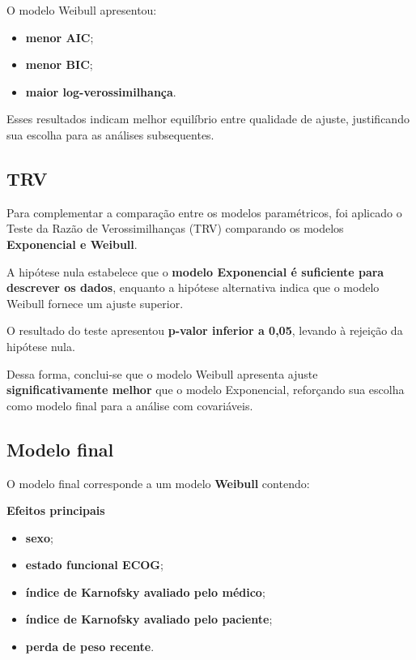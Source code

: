 \documentclass[
  brazilian,
  letterpaper,
  DIV=11,
  numbers=noendperiod]{scrartcl}
\providecommand{\tightlist}{%
  \setlength{\itemsep}{0pt}\setlength{\parskip}{0pt}}
\begin{document}
O modelo Weibull apresentou:

\begin{itemize}
\tightlist
\item
  \textbf{menor AIC};
\item
  \textbf{menor BIC};
\item
  \textbf{maior log-verossimilhança}.
\end{itemize}

Esses resultados indicam melhor equilíbrio entre qualidade de ajuste,
justificando sua escolha para as análises subsequentes.

\subsection{\texorpdfstring{\textbf{TRV}}{TRV}}\label{trv}

Para complementar a comparação entre os modelos paramétricos, foi
aplicado o Teste da Razão de Verossimilhanças (TRV) comparando os
modelos \textbf{Exponencial e Weibull}.

A hipótese nula estabelece que o \textbf{modelo Exponencial é suficiente
para descrever os dados}, enquanto a hipótese alternativa indica que o
modelo Weibull fornece um ajuste superior.

O resultado do teste apresentou \textbf{p-valor inferior a 0,05},
levando à rejeição da hipótese nula.

Dessa forma, conclui-se que o modelo Weibull apresenta ajuste
\textbf{significativamente melhor} que o modelo Exponencial, reforçando
sua escolha como modelo final para a análise com covariáveis.

\subsection{\texorpdfstring{\textbf{Modelo
final}}{Modelo final}}\label{modelo-final}

O modelo final corresponde a um modelo \textbf{Weibull} contendo:

\textbf{Efeitos principais}

\begin{itemize}
\tightlist
\item
  \textbf{sexo};
\item
  \textbf{estado funcional ECOG};
\item
  \textbf{índice de Karnofsky avaliado pelo médico};
\item
  \textbf{índice de Karnofsky avaliado pelo paciente};
\item
  \textbf{perda de peso recente}.
\end{itemize}
\end{document}
